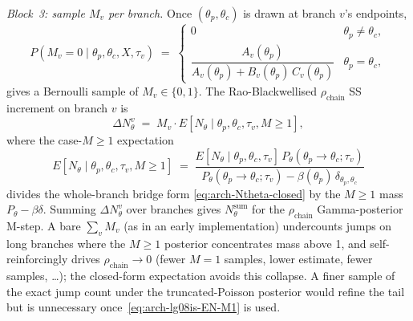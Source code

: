 \emph{Block~3: sample $M_v$ per branch.} Once $(\theta_p, \theta_c)$ is
drawn at branch $v$'s endpoints,
\begin{equation}
  P(M_v = 0 \mid \theta_p, \theta_c, X, \tau_v)
    \;=\; \begin{cases}
       0 & \theta_p \ne \theta_c, \\
       \dfrac{A_v(\theta_p)}{A_v(\theta_p) + B_v(\theta_p) \, C_v(\theta_p)}
         & \theta_p = \theta_c,
    \end{cases}
  \label{eq:arch-lg08is-M-binary}
\end{equation}
gives a Bernoulli sample of $M_v \in \{0, 1\}$. The Rao-Blackwellised
$\rho_{\mathrm{chain}}$ SS increment on branch $v$ is
\begin{equation}
  \Delta N_\theta^v \;=\; M_v \cdot E[N_\theta \mid \theta_p, \theta_c, \tau_v, M \geq 1],
  \label{eq:arch-lg08is-N-inc}
\end{equation}
where the case-$M \geq 1$ expectation
\begin{equation}
  E[N_\theta \mid \theta_p, \theta_c, \tau_v, M \geq 1]
    \;=\; \frac{E[N_\theta \mid \theta_p, \theta_c, \tau_v]\,
                 P_\theta(\theta_p \to \theta_c; \tau_v)}
                {P_\theta(\theta_p \to \theta_c; \tau_v)
                  - \beta(\theta_p)\,\delta_{\theta_p, \theta_c}}
  \label{eq:arch-lg08is-EN-M1}
\end{equation}
divides the whole-branch bridge form
\eqref{eq:arch-Ntheta-closed} by the $M \geq 1$ mass $P_\theta - \beta
\delta$. Summing $\Delta N_\theta^v$ over branches gives
$N_\theta^{\mathrm{sum}}$ for the $\rho_{\mathrm{chain}}$
Gamma-posterior M-step. A bare $\sum_v M_v$ (as in an early
implementation) undercounts jumps on long branches where the
$M \geq 1$ posterior concentrates mass above 1, and self-reinforcingly
drives $\rho_{\mathrm{chain}} \to 0$ (fewer $M = 1$ samples, lower
estimate, fewer samples, \ldots); the closed-form expectation avoids
this collapse. A finer sample of the exact jump count under the
truncated-Poisson posterior would refine the tail but is unnecessary
once~\eqref{eq:arch-lg08is-EN-M1} is used.

